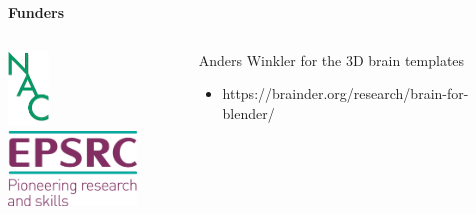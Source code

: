 \documentclass[10pt,xcolor=table,aspectratio=169]{beamer}
\begin{document}
\begin{frame}
\begin{figure}
\end{figure}



\vspace{1em}

\textbf{Funders}\\
\begin{columns}
\begin{column}{0.4\textwidth}

\vspace{1em}

\includegraphics[height=2cm]{images/nac_logo} \hspace{2em}
\includegraphics[height=2cm]{images/epsrc_logo}
\end{column}
\begin{column}{0.4\textwidth}
Anders Winkler for the 3D brain templates\\
 \begin{itemize}
  \item https://brainder.org/research/brain-for-blender/
 \end{itemize}

\end{column}

\end{columns}
 

 

  
\end{frame}


\end{document}
